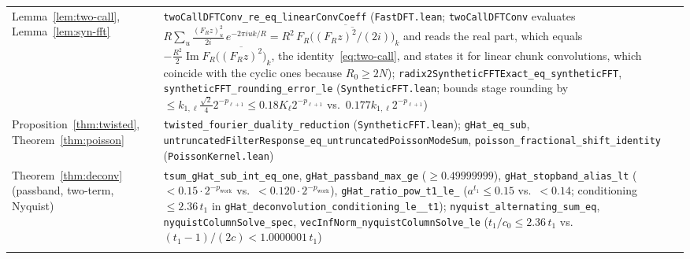 \begin{table}[!t]
\begin{tabular}{@{}>{\raggedright}p{}>{\raggedright\arraybackslash}p{}@{}}
Lemma~\ref{lem:two-call}, Lemma~\ref{lem:syn-fft} & \texttt{twoCallDFTConv\_\allowbreak re\_\allowbreak eq\_\allowbreak linear\allowbreak Conv\allowbreak Coeff} (\texttt{FastDFT.lean}; \texttt{twoCall\allowbreak DFTConv} evaluates $R\sum_u \frac{(F_R z)_u^2}{2i}\,e^{-2\pi i uk/R} = R^2\,\overline{F_R\bigl(\overline{(F_R z)^2/(2i)}\bigr)}_k$ and reads the real part, which equals $-\frac{R^2}{2}\operatorname{Im}F_R\bigl(\overline{(F_R z)^2}\bigr)_k$, the identity~\eqref{eq:two-call}, and states it for linear chunk convolutions, which coincide with the cyclic ones because $R_0 \ge 2N$); \texttt{radix2\allowbreak SyntheticFFTExact\_\allowbreak eq\_\allowbreak syntheticFFT}, \texttt{syntheticFFT\_\allowbreak rounding\_\allowbreak error\_\allowbreak le} (\texttt{SyntheticFFT.lean}; bounds stage rounding by $\le k_{1,\ell}\frac{\sqrt{2}}{4}2^{-p_{\ell+1}}\le 0.18 K_\ell 2^{-p_{\ell+1}}$ vs.\ $0.177 k_{1,\ell} 2^{-p_{\ell+1}}$) \\\addlinespace[1.5pt]
Proposition~\ref{thm:twisted}, Theorem~\ref{thm:poisson} & \texttt{twisted\_\allowbreak fourier\_\allowbreak duality\_\allowbreak reduction} (\texttt{SyntheticFFT.lean}); \texttt{gHat\_\allowbreak eq\_\allowbreak sub}, \texttt{untruncated\allowbreak Filter\allowbreak Response\_\allowbreak eq\_\allowbreak untruncated\allowbreak Poisson\allowbreak ModeSum}, \texttt{poisson\_\allowbreak fractional\_\allowbreak shift\_\allowbreak identity} (\texttt{PoissonKernel.lean}) \\\addlinespace[1.5pt]
Theorem~\ref{thm:deconv} (passband, two-term, Nyquist) & \texttt{tsum\_\allowbreak gHat\_\allowbreak sub\_\allowbreak int\_\allowbreak eq\_\allowbreak one}, \texttt{gHat\_\allowbreak passband\_\allowbreak max\_\allowbreak ge} ($\ge 0.49999999$), \texttt{gHat\_\allowbreak stopband\_\allowbreak alias\_\allowbreak lt} ($< 0.15\cdot 2^{-p_{\mathrm{work}}}$ vs.\ $< 0.120\cdot 2^{-p_{\mathrm{work}}}$), \texttt{gHat\_\allowbreak ratio\_\allowbreak pow\_\allowbreak t1\_\allowbreak le\_\allowbreak 015} ($a^{t_1} \le 0.15$ vs.\ $< 0.14$; conditioning $\le 2.36\,t_1$ in \texttt{gHat\_\allowbreak deconvolution\_\allowbreak conditioning\_\allowbreak le\_\allowbreak 236\_\allowbreak t1}); \texttt{nyquist\_\allowbreak alternating\_\allowbreak sum\_\allowbreak eq}, \texttt{nyquist\allowbreak Column\allowbreak Solve\_\allowbreak spec}, \texttt{vecInfNorm\_\allowbreak nyquist\allowbreak Column\allowbreak Solve\_\allowbreak le} ($t_1/c_0 \le 2.36\,t_1$ vs.\ $(t_1-1)/(2c) < 1.0000001\,t_1$) \\\addlinespace[1.5pt]

\end{tabular}
\end{table}
